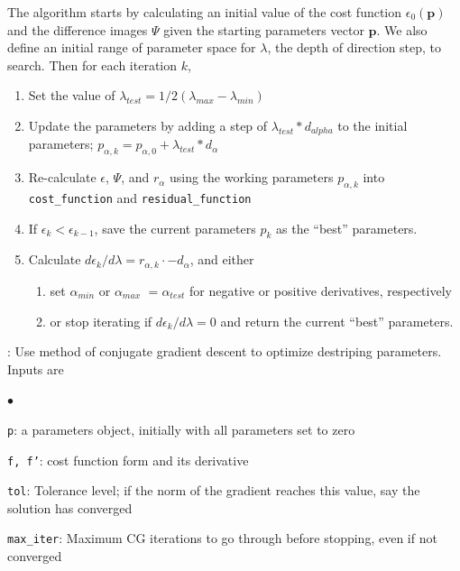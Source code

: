 \documentclass[12pt]{pasj01}
\begin{document}
The algorithm starts by calculating an initial value of the cost function $\epsilon_{0}(\textbf{p})$ and the difference images $\Psi$ given the starting parameters vector $\textbf{p}$. We also define an initial range of parameter space for $\lambda$, the depth of direction step, to search. Then for each iteration $k$,
\begin{enumerate}
    \item Set the value of $\lambda_{test} = 1/2(\lambda_{max}-\lambda_{min})$
    \item Update the parameters by adding a step of $\lambda_{test} * d_{alpha}$ to the initial parameters; $p_{\alpha,k}=p_{\alpha,0}+\lambda_{test}*d_{\alpha}$
    \item Re-calculate $\epsilon$, $\Psi$, and $r_{\alpha}$ using the working parameters $p_{\alpha, k}$ into {\tt cost\_function} and {\tt residual\_function} 
    \item If $\epsilon_k<\epsilon_{k-1}$, save the current parameters $p_k$ as the ``best'' parameters.
    \item Calculate $d\epsilon_k / d\lambda = r_{\alpha,k} \cdot -d_{\alpha}$, and either
    \begin{enumerate}
        \item set $\alpha_{min}$ or $\alpha_{max}$ $=\alpha_{test}$ for negative or positive derivatives, respectively
        \item or stop iterating if $d\epsilon_k / d\lambda=0$ and return the current ``best'' parameters.
    \end{enumerate}
\end{enumerate}

\vskip 0.05in

:
Use method of conjugate gradient descent to optimize destriping parameters. Inputs are
\begin{list}{$\bullet$}{}
    \item {\tt p}: a parameters object, initially with all parameters set to zero
    \item {\tt f, f'}: cost function form and its derivative
    \item {\tt tol}: Tolerance level; if the norm of the gradient reaches this value, say the solution has converged
    \item {\tt max\_iter}: Maximum CG iterations to go through before stopping, even if not converged
\end{list}
\end{document}
